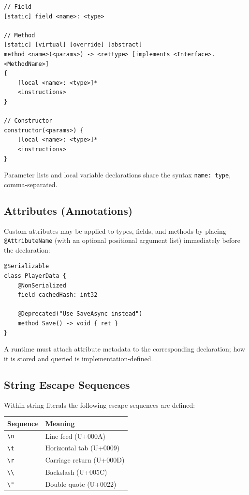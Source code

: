 \documentclass[11pt,a4paper]{article}
\newcommand{\code}[1]{\texttt{\small #1}}
\newcommand{\term}[1]{\texttt{#1}}
\begin{document}
\begin{lstlisting}[style=textir]
// Field
[static] field <name>: <type>

// Method
[static] [virtual] [override] [abstract]
method <name>(<params>) -> <rettype> [implements <Interface>.<MethodName>]
{
    [local <name>: <type>]*
    <instructions>
}

// Constructor
constructor(<params>) {
    [local <name>: <type>]*
    <instructions>
}
\end{lstlisting}

Parameter lists and local variable declarations share the syntax
\code{name: type}, comma-separated.


\subsection{Attributes (Annotations)}

Custom attributes may be applied to types, fields, and methods by placing
\term{@AttributeName} (with an optional positional argument list) immediately
before the declaration:

\begin{lstlisting}[style=textir]
@Serializable
class PlayerData {
    @NonSerialized
    field cachedHash: int32

    @Deprecated("Use SaveAsync instead")
    method Save() -> void { ret }
}
\end{lstlisting}

A runtime must attach attribute metadata to the corresponding declaration;
how it is stored and queried is implementation-defined.

\subsection{String Escape Sequences}

Within string literals the following escape sequences are defined:

\begin{center}
\begin{tabular}{ll}
  \toprule
  \textbf{Sequence} & \textbf{Meaning} \\
  \midrule
  \texttt{\textbackslash n}              & Line feed (U+000A) \\
  \texttt{\textbackslash t}              & Horizontal tab (U+0009) \\
  \texttt{\textbackslash r}              & Carriage return (U+000D) \\
  \texttt{\textbackslash\textbackslash}  & Backslash (U+005C) \\
  \texttt{\textbackslash"}              & Double quote (U+0022) \\
  \bottomrule
\end{tabular}
\end{center}
\end{document}
